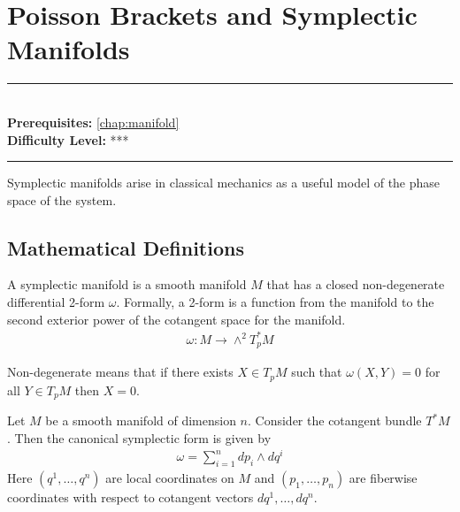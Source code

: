 \documentclass[book.tex]{subfiles}
\begin{document}
\chapter{Poisson Brackets and Symplectic Manifolds}
\label{chap:poisson_bracket}
\noindent\rule{11cm}{0.4pt} \\
\textbf{Prerequisites:} \autoref{chap:manifold} \\
\textbf{Difficulty Level:} *** \\
\noindent\rule{11cm}{0.4pt}
\vspace{5mm}

Symplectic manifolds arise in classical mechanics as a useful model of the phase space of the system.

\section{Mathematical Definitions}
A symplectic manifold is a smooth manifold $M$ that has a closed non-degenerate differential 2-form $\omega$. Formally, a 2-form is a function from the manifold to the second exterior power of the cotangent space for the manifold.
\begin{align}
\omega: M \to \wedge^2 T_p^* M
\end{align}


Non-degenerate means that if there exists $X \in T_p M$ such that $\omega(X, Y) = 0$ for all $Y \in T_p M$ then $X = 0$.


Let $M$ be a smooth manifold of dimension $n$. Consider the cotangent bundle $T^*M$. Then the canonical symplectic form is given by
\begin{align}
\omega = \sum_{i=1}^n dp_i \wedge dq^i
\end{align}
Here $(q^1,\dotsc,q^n)$ are local coordinates on $M$ and $(p_1,\dotsc,p_n)$ are fiberwise coordinates with respect to cotangent vectors $dq^1,\dotsc,dq^n$.



\end{document}
